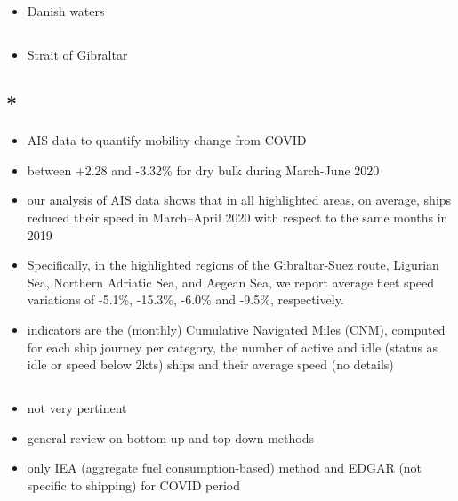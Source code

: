 \documentclass{article}
\newcommand{\paperpath}{../resources/}
\newcommand{\myhref}[2]{\href{run:\paperpath#1}{#2}}
\begin{document}
\subsection{\myhref{Chen et al 2023 - Effects of COVID-19 on passenger shipping activities and emissions.pdf}{\textcite{chen2023effects}}}
\begin{itemize}
    \item Danish waters
\end{itemize}
\subsection{\myhref{Duran-Grados 2020 - Calculating a Drop in Carbon Emissions in the Strait of Gibraltar.pdf}{\textcite{duran2020calculating}}}
\begin{itemize}
    \item Strait of Gibraltar
\end{itemize}

\subsection{*\myhref{Millefiori 2021 - COVID-19 impact on global maritime mobility.pdf}{\textcite{millefiori2021covid}}}
\begin{itemize}
    \item AIS data to quantify mobility change from COVID
    \item between +2.28 and -3.32\% for dry bulk during March-June 2020
    \item our analysis of AIS data shows that in all highlighted areas, on average, ships reduced their speed in March–April 2020 with respect to the same months in 2019
    \item Specifically, in the highlighted regions of the Gibraltar-Suez route, Ligurian Sea, Northern Adriatic Sea, and Aegean Sea, we report average fleet speed variations of -5.1\%, -15.3\%, -6.0\% and -9.5\%, respectively.
    \item indicators are the (monthly) Cumulative Navigated Miles (CNM), computed for each ship journey per category, the number of active and idle (status as idle or speed below 2kts) ships and their average speed (no details)
\end{itemize}
\subsection{\myhref{Deng 2023 - A review on carbon emissions of global shipping.pdf}{\textcite{deng2023review}}}
\begin{itemize}
    \item not very pertinent
    \item general review on bottom-up and top-down methods
    \item only IEA (aggregate fuel consumption-based) method and EDGAR (not specific to shipping) for COVID period
\end{itemize}
\end{document}
